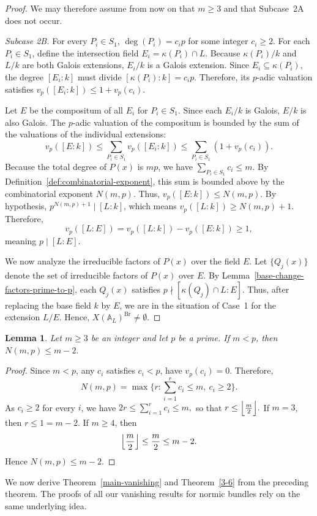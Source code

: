 \documentclass[10pt]{amsart}
\theoremstyle{plain}
\newtheorem{lemma}[thm]{Lemma}
\theoremstyle{definition}
\newcommand{\Br}{\operatorname{Br}}
\begin{document}
\begin{proof}
We may therefore assume from now on that \(m\ge 3\) and that Subcase~2A does
not occur.

\smallskip

\noindent\textit{Subcase 2B.} For every \(P_i\in S_1\), \(\deg(P_i)=c_i p\) for some integer \(c_i\ge 2\).
For each $P_i \in S_1$, define the intersection field $E_i = \kappa(P_i) \cap L$. Because $\kappa(P_i)/k$ and $L/k$ are both Galois extensions, $E_i/k$ is a Galois extension. Since $E_i \subseteq \kappa(P_i)$, the degree $[E_i:k]$ must divide $[\kappa(P_i):k] = c_i p$. Therefore, its $p$-adic valuation satisfies $v_p([E_i:k]) \le 1 + v_p(c_i)$.

Let $E$ be the compositum of all $E_i$ for $P_i \in S_1$. Since each $E_i/k$ is Galois, $E/k$ is also Galois. The $p$-adic valuation of the compositum is bounded by the sum of the valuations of the individual extensions:
$$
v_p([E:k]) \le \sum_{P_i \in S_1} v_p([E_i:k]) \le \sum_{P_i \in S_1} (1 + v_p(c_i)).
$$
Because the total degree of $P(x)$ is $mp$, we have $\sum_{P_i \in S_1} c_i \le m$. By Definition~\ref{def:combinatorial-exponent}, this sum is bounded above by the combinatorial exponent $N(m, p)$. Thus, $v_p([E:k]) \le N(m, p)$. 
By hypothesis, $p^{N(m,p)+1} \mid [L:k]$, which means $v_p([L:k]) \ge N(m, p) + 1$. Therefore,
$$
v_p([L:E]) = v_p([L:k]) - v_p([E:k]) \ge 1,
$$
meaning $p \mid [L:E]$.

We now analyze the irreducible factors of \(P(x)\) over the field \(E\). Let
\(\{Q_j(x)\}\) denote the set of irreducible factors of \(P(x)\) over \(E\).
By Lemma~\ref{base-change-factors-prime-to-p}, each \(Q_j(x)\) satisfies
\(p\nmid [\kappa(Q_j)\cap L:E]\). Thus, after replacing the base field \(k\) by
\(E\), we are in the situation of Case~1 for the extension \(L/E\). Hence, $X(\mathbb{A}_L)^{\Br}\neq\emptyset$.
\end{proof}\begin{lemma}\label{Nmp-bound}
Let $m\ge3$ be an integer and let $p$ be a prime. If $m<p$, then
\(N(m,p)\le m-2.\)
\end{lemma}

\begin{proof}
Since $m<p$, any $c_i$ satisfies $c_i<p$, have $v_p(c_i)=0$. Therefore,
$$
N(m,p)=\max\{r:\sum_{i=1}^r c_i\le m,\ c_i\ge2\}.
$$
As $c_i\ge2$ for every $i$, we have
\(2r\le\sum_{i=1}^r c_i\le m,\) so that
\(r\le\Bigl\lfloor\frac m2\Bigr\rfloor.\) If $m=3$, then $r\le1=m-2$. If $m\ge4$, then
$$
\Bigl\lfloor\frac m2\Bigr\rfloor\le\frac m2\le m-2.
$$ Hence $N(m,p)\le m-2$.
\end{proof}
We now derive Theorem~\ref{main-vanishing} and Theorem~\ref{3-6} from the preceding theorem. The proofs of all our vanishing results for normic bundles rely on the same underlying idea.
\end{document}
